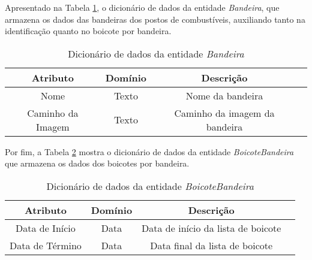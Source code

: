 Apresentado na Tabela \ref{dic:flag}, o dicionário de dados da entidade \textit{Bandeira}, que armazena os dados das bandeiras dos postos de combustíveis, auxiliando tanto na identificação quanto no boicote por bandeira.

\begin{table}[H]
\centering
\caption{Dicionário de dados da entidade \textit{Bandeira}}
\label{dic:flag}
\begin{tabular}{|c|c|c|c|}\hline
\textbf{Atributo} & \textbf{Domínio} & \textbf{Descrição}   \\ \hline
Nome                      & Texto                                           & Nome da bandeira \\ \hline
Caminho da Imagem                       & Texto                                           & Caminho da imagem da bandeira\\ \hline

\end{tabular}
\end{table}

Por fim, a Tabela \ref{dic:flag_boycott} mostra o dicionário de dados da entidade \textit{BoicoteBandeira} que armazena os dados dos boicotes por bandeira.

\begin{table}[H]
\centering
\caption{Dicionário de dados da entidade \textit{BoicoteBandeira}}
\label{dic:flag_boycott}
\begin{tabular}{|c|c|c|c|}\hline
\textbf{Atributo} & \textbf{Domínio}  & \textbf{Descrição}   \\ \hline
Data de Início                      & Data                                           & Data de início da lista de boicote \\ \hline
Data de Término                       & Data                                         & Data final da lista de boicote\\ \hline

\end{tabular}
\end{table}
